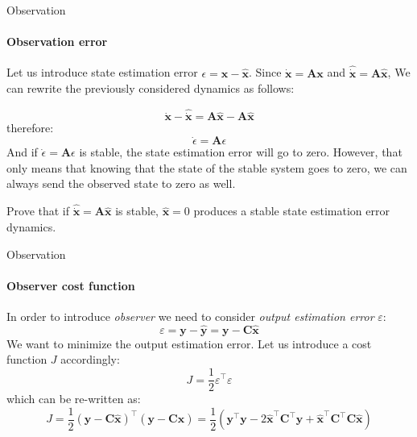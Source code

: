 \documentclass{beamer}
\begin{document}
\begin{frame}{Observation}
\framesubtitle{Observation error}
\begin{flushleft}

Let us introduce state estimation error $\epsilon = \mathbf x -  \hat{\mathbf x}$. Since $\dot {\mathbf x} = \mathbf A \mathbf x$ and $\hat{\dot {\mathbf x}} = \mathbf A \hat{\mathbf x}$, We can rewrite the previously considered dynamics as follows:

\[
\dot {\mathbf x} - \hat{\dot {\mathbf x}} = \mathbf A \hat{\mathbf x} - \mathbf A \hat{\mathbf x}
\]
therefore:
\[
\dot {\epsilon} = \mathbf A \epsilon
\]
And if $\dot {\epsilon} = \mathbf A \epsilon$ is stable, the state estimation error will go to zero. However, that only means that knowing that the state of the stable system goes to zero, we can always send the observed state to zero as well.

Prove that if $\hat{\dot {\mathbf x}} = \mathbf A \hat{\mathbf x}$ is stable, $\hat{\mathbf x} = 0$ produces a stable state estimation error dynamics.

\end{flushleft}
\end{frame}


\begin{frame}{Observation}
\framesubtitle{Observer cost function}
\begin{flushleft}

In order to introduce \emph{observer} we need to consider \emph{output estimation error} $\varepsilon$:
%
\[
\varepsilon = \mathbf y - \hat{\mathbf y} = \mathbf y - \mathbf C \hat{\mathbf x}
\]
%
We want to minimize the output estimation error. Let us introduce a cost function $J$ accordingly:
%
\[
J = \frac{1}{2} \varepsilon^\top \varepsilon
\]
%
which can be re-written as:
%
\[
J = \frac{1}{2} (\mathbf y - \mathbf C \hat{\mathbf x})^\top (\mathbf y - \mathbf C \hat{\mathbf x}) = 
\frac{1}{2} (\mathbf y^\top \mathbf y - 
2 \hat{\mathbf x}^\top \mathbf C^\top \mathbf y + 
\hat{\mathbf x}^\top \mathbf C^\top \mathbf C \hat{\mathbf x})
\]


\end{flushleft}
\end{frame}
\end{document}
